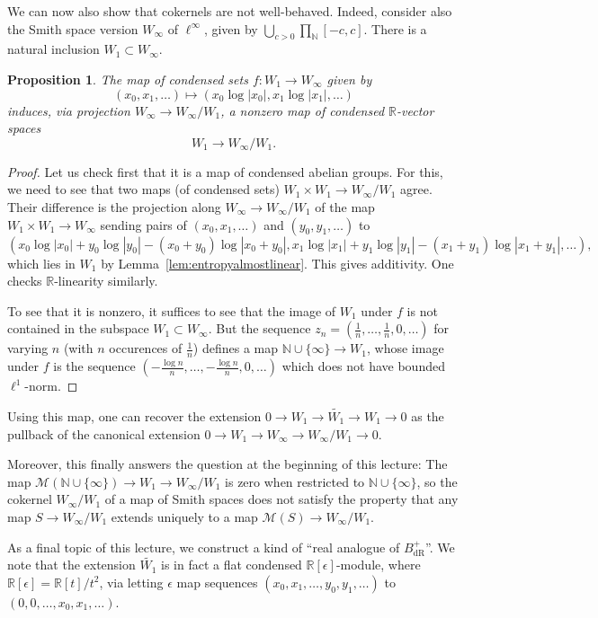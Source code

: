 \documentclass[11pt]{amsbook}
\numberwithin{equation}{section}
\numberwithin{theorem}{section}
\newtheorem{proposition}[theorem]{Proposition}
\theoremstyle{definition}
\begin{document}
We can now also show that cokernels are not well-behaved. Indeed, consider also the Smith space version $W_\infty$ of $\ell^\infty$, given by $\bigcup_{c>0}\prod_{\mathbb N} [-c,c]$. There is a natural inclusion $W_1\subset W_\infty$.

\begin{proposition} The map of condensed sets $f: W_1\to W_\infty$ given by
\[
(x_0,x_1,\ldots)\mapsto (x_0\log|x_0|,x_1\log|x_1|,\ldots)
\]
induces, via projection $W_\infty\to W_\infty/W_1$, a nonzero map of condensed $\mathbb R$-vector spaces
\[
W_1\to W_\infty/W_1.
\]
\end{proposition}

\begin{proof} Let us check first that it is a map of condensed abelian groups. For this, we need to see that two maps (of condensed sets) $W_1\times W_1\to W_\infty/W_1$ agree. Their difference is the projection along $W_\infty\to W_\infty/W_1$ of the map $W_1\times W_1\to W_\infty$ sending pairs of $(x_0,x_1,\ldots)$ and $(y_0,y_1,\ldots)$ to
\[
(x_0\log|x_0|+y_0\log|y_0|-(x_0+y_0)\log|x_0+y_0|,x_1\log|x_1|+y_1\log|y_1|-(x_1+y_1)\log|x_1+y_1|,\ldots),
\]
which lies in $W_1$ by Lemma~\ref{lem:entropyalmostlinear}. This gives additivity. One checks $\mathbb R$-linearity similarly.

To see that it is nonzero, it suffices to see that the image of $W_1$ under $f$ is not contained in the subspace $W_1\subset W_\infty$. But the sequence $z_n=(\tfrac 1n,\ldots,\tfrac 1n,0,\ldots)$ for varying $n$ (with $n$ occurences of $\tfrac 1n$) defines a map $\mathbb N\cup\{\infty\}\to W_1$, whose image under $f$ is the sequence $(-\frac{\log n}n,\ldots,-\frac{\log n}n,0,\ldots)$ which does not have bounded $\ell^1$-norm.
\end{proof}

Using this map, one can recover the extension $0\to W_1\to \widetilde{W_1}\to W_1\to 0$ as the pullback of the canonical extension $0\to W_1\to W_\infty\to W_\infty/W_1\to 0$.

Moreover, this finally answers the question at the beginning of this lecture: The map $\mathcal M(\mathbb N\cup \{\infty\})\to W_1\to W_\infty/W_1$ is zero when restricted to $\mathbb N\cup \{\infty\}$, so the cokernel $W_\infty/W_1$ of a map of Smith spaces does not satisfy the property that any map $S\to W_\infty/W_1$ extends uniquely to a map $\mathcal M(S)\to W_\infty/W_1$.

As a final topic of this lecture, we construct a kind of ``real analogue of $B_{\mathrm{dR}}^+$''. We note that the extension $\widetilde{W_1}$ is in fact a flat condensed $\mathbb R[\epsilon]$-module, where $\mathbb R[\epsilon] = \mathbb R[t]/t^2$, via letting $\epsilon$ map sequences $(x_0,x_1,\ldots,y_0,y_1,\ldots)$ to $(0,0,\ldots,x_0,x_1,\ldots)$.
\end{document}
